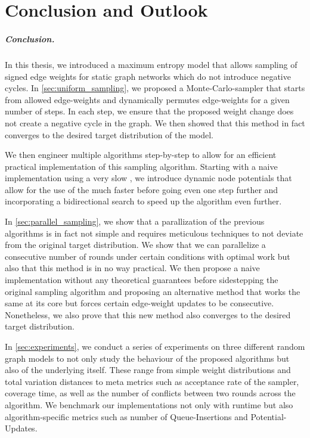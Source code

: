 \chapter{Conclusion and Outlook}\label{sec:conclusion}
\paragraph{Conclusion.} 
In this thesis, we introduced a maximum entropy model that allows sampling of signed edge weights for static graph networks which do not introduce negative cycles.
In \cref{sec:uniform_sampling}, we proposed a Monte-Carlo-\markov sampler that starts from allowed edge-weights and dynamically permutes edge-weights for a given number of steps.
In each step, we ensure that the proposed weight change does not create a negative cycle in the graph.
We then showed that this method in fact converges to the desired target distribution of the model.

We then engineer multiple algorithms step-by-step to allow for an efficient practical implementation of this sampling algorithm.
Starting with a naive implementation using a very slow \algbf, we introduce dynamic node potentials that allow for the use of the much faster \algdk before going even one step further and incorporating a bidirectional search \algbd to speed up the algorithm even further.

In \cref{sec:parallel_sampling}, we show that a parallization of the previous algorithms is in fact not simple and requires meticulous techniques to not deviate from the original target distribution.
We show that we can parallelize a consecutive number of rounds under certain conditions with optimal work but also that this method is in no way practical.
We then propose a naive implementation without any theoretical guarantees before sidestepping the original sampling algorithm and proposing an alternative method \algns that works the same at its core but forces certain edge-weight updates to be consecutive.
Nonetheless, we also prove that this new method also converges to the desired target distribution.

\medskip

In \cref{sec:experiments}, we conduct a series of experiments on three different random graph models to not only study the behaviour of the proposed algorithms but also of the underlying \markov itself.
These range from simple weight distributions and total variation distances to meta metrics such as acceptance rate of the sampler, coverage time, as well as the number of conflicts between two rounds across the algorithm.
We benchmark our implementations not only with runtime but also algorithm-specific metrics such as number of Queue-Insertions and Potential-Updates.

